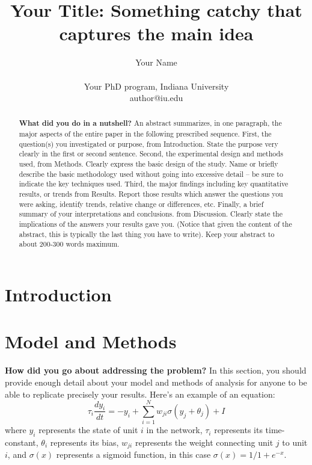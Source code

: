 \documentclass[letterpaper]{article}
\title{Your Title: Something catchy that captures the main idea}
\author{Your Name\\
\mbox{}\\
Your PhD program, Indiana University\\
author@iu.edu}
\begin{document}
\maketitle

\begin{abstract}
{\bf What did you do in a nutshell?} An abstract summarizes, in one paragraph, the major aspects of the entire paper in the following prescribed sequence. First, the question(s) you investigated or purpose, from Introduction. State the purpose very clearly in the first or second sentence. Second, the experimental design and methods used, from Methods. Clearly express the basic design of the study. Name or briefly describe the basic methodology used without going into excessive detail -- be sure to indicate the key techniques used. Third, the major findings including key quantitative results, or trends from Results. Report those results which answer the questions you were asking, identify trends, relative change or differences, etc. Finally, a brief summary of your interpretations and conclusions. from Discussion. Clearly state the implications of the answers your results gave you. (Notice that given the content of the abstract, this is typically the last thing you have to write). Keep your abstract to about 200-300 words maximum.
\end{abstract}

\section{Introduction}



\section{Model and Methods}
{\bf How did you go about addressing the problem?} In this section, you should provide enough detail about your model and methods of analysis for anyone to be able to replicate precisely your results. Here's an example of an equation: 
\begin{equation}
    \tau_i \frac{dy_i}{dt} = -y_i + \sum_{i=1}^{N} w_{ji} \sigma(y_j+\theta_j) + I
\end{equation}
\noindent where $y_i$ represents the state of unit $i$ in the network, $\tau_i$ represents its time-constant, $\theta_i$ represents its bias, $w_{ji}$ represents the weight connecting unit $j$ to unit $i$, and $\sigma(x)$ represents a sigmoid function, in this case $\sigma(x)=1/1+e^{-x}$.
\end{document}
